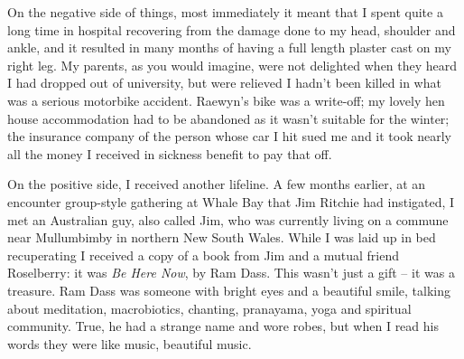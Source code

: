 On the negative side of things, most immediately it meant that I spent
quite a long time in hospital recovering from the damage done to my
head, shoulder and ankle, and it resulted in many months of having a
full length plaster cast on my right leg. My parents, as you would
imagine, were not delighted when they heard I had dropped out of
university, but were relieved I hadn't been killed in what was a serious
motorbike accident. Raewyn's bike was a write-off; my lovely hen house
accommodation had to be abandoned as it wasn't suitable for the winter;
the insurance company of the person whose car I hit sued me and it took
nearly all the money I received in sickness benefit to pay that off.

\enlargethispage{\baselineskip}

On the positive side, I received another lifeline. A few months earlier,
at an encounter group-style gathering at Whale Bay that Jim Ritchie had
instigated, I met an Australian guy, also called Jim, who was currently
living on a commune near Mullumbimby in northern New South Wales. While
I was laid up in bed recuperating I received a copy of a book from Jim
and a mutual friend Roselberry: it was \emph{Be Here Now}, by Ram Dass.
This wasn't just a gift -- it was a treasure. Ram Dass was someone with
bright eyes and a beautiful smile, talking about meditation,
macrobiotics, chanting, pranayama, yoga and spiritual community. True,
he had a strange name and wore robes, but when I read his words they
were like music, beautiful music.

